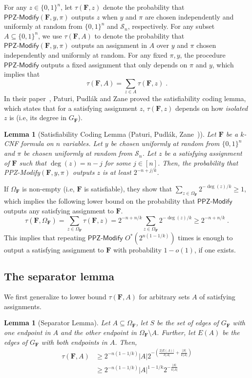 \documentclass[11pt, letterpaper]{article}
\newtheorem{lemma}[theorem]{Lemma}
\theoremstyle{definition}
\newcommand{\f}{\mathbf{F}}
\newcommand{\Om}{\Omega_{\f}}
\newcommand{\PPZMod}{\textsf{PPZ-Modify}}
\begin{document}
For any $z \in \{0,1\}^n$, let $\tau(\f,z)$ denote the probability that $\PPZMod(\f,y,\pi)$ outputs $z$ when $y$ and $\pi$ are chosen independently and uniformly at random from $\{0,1\}^n$ and $\mathcal{S}_n$, respectively. For any subset $A \subseteq \{0,1\}^n$, we use $\tau(\f,A)$ to denote the probability that $\PPZMod(\f,y,\pi)$ outputs an assignment in $A$ over $y$ and $\pi$ chosen independently and uniformly at random. For any fixed $\pi,y$, the procedure $\PPZMod$ outputs a fixed assignment that only depends on $\pi$ and $y$, which implies that
\[\tau(\f, A)  =\sum_{z \in A} \tau(\f, z) \;.\]
In their paper~\cite{PPZ}, Paturi, Pudl{\'a}k and Zane proved the satisfiability coding lemma, which states that for a satisfying assignment $z$, $\tau(\f,z)$ depends on how \emph{isolated} $z$ is (i.e, its degree in $G_\f$).
\begin{lemma}[Satisfiability Coding Lemma (Paturi, Pudl{\'a}k, Zane~\cite{PPZ})] 
\label{lem:ppz-j-isolated}
Let $\f$ be a $k$-CNF formula on $n$ variables. Let $y$ be chosen uniformly at random from $\{0,1\}^n$ and $\pi$ be chosen uniformly at random from $\mathcal{S}_n$. Let $z$ be a satisfying assignment of $\f$ such that $\deg(z) = n-j$ for some $j \in [n]$. Then, the probability that \PPZMod$(\f,y,\pi)$ outputs $z$ is at least $2^{-n+j/k}$. 
\end{lemma} 
\noindent
If $\Om$ is non-empty (i.e, $\f$ is satisfiable), they show that $\sum_{z \in \Om} 2^{-\deg(z)/k} \geq 1$, which implies the following lower bound on the probability that $\PPZMod$ outputs any satisfying assignment to $\f$.
$$\tau(\f,\Om)=\sum_{z \in \Om}\tau(\f,z)=2^{-n+n/k} \sum_{z \in \Om} 2^{-\deg(z)/k} \geq 2^{-n+n/k}\;.$$
This implies that repeating $\PPZMod$ $O^*\left(2^{n(1-1/k)}\right)$ times is enough to output a satisfying assignment to $\f$ with probability $1-o(1)$, if one exists.

\subsection{The separator lemma}
\label{sec:separator}

We first generalize  to lower bound $\tau(\f,A)$ for arbitrary sets $A$ of satisfying assignments.
\begin{lemma}[Separator Lemma] \label{lem:separator}
    Let $A \subseteq \Om$, let $S$ be the set of edges of $G_\f$ with one endpoint in $A$ and the other endpoint in $\Om \setminus A$. Further, let $E(A)$ be the  edges of $G_\f$ with both endpoints in $A$. Then, 
\begin{align}
    \tau(\f,A) & \geq 2^{-n(1-1/k)}|A|2^{-\left(  \frac{2|E(A)|}{k|A|}+\frac{|S|}{k|A|}\right)} \label{eq:sep1} \\
    & \geq 2^{-n(1-1/k)}|A|^{1-1/k}2^{-\frac{|S|}{k|A|}} \label{eq:sep2}
\end{align}    
    
\end{lemma}
\end{document}
